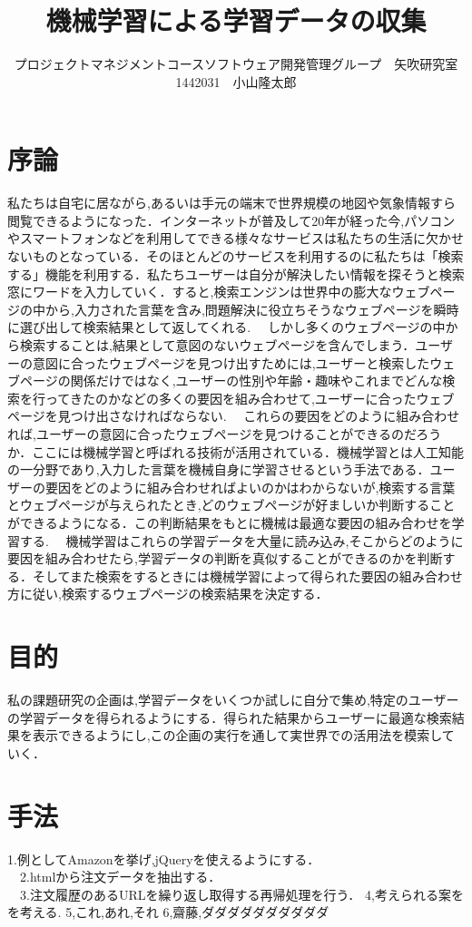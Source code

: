 \documentclass[uplatex,twocolumn,dvipdfmx]{jsarticle}
\title{\vspace{-5mm}\fontsize{14pt}{0pt}\selectfont 機械学習による学習データの収集}
\author{\normalsize プロジェクトマネジメントコースソフトウェア開発管理グループ　矢吹研究室　1442031　小山隆太郎}
\date{}
\begin{document}
\fontsize{10.5pt}{\baselineskip}\selectfont
\maketitle





\section{序論}
私たちは自宅に居ながら,あるいは手元の端末で世界規模の地図や気象情報すら閲覧できるようになった．インターネットが普及して20年が経った今,パソコンやスマートフォンなどを利用してできる様々なサービスは私たちの生活に欠かせないものとなっている．そのほとんどのサービスを利用するのに私たちは「検索する」機能を利用する．私たちユーザーは自分が解決したい情報を探そうと検索窓にワードを入力していく．すると,検索エンジンは世界中の膨大なウェブページの中から,入力された言葉を含み,問題解決に役立ちそうなウェブページを瞬時に選び出して検索結果として返してくれる.\cite{KADOKAWA2015}
　しかし多くのウェブページの中から検索することは,結果として意図のないウェブページを含んでしまう．ユーザーの意図に合ったウェブページを見つけ出すためには,ユーザーと検索したウェブページの関係だけではなく,ユーザーの性別や年齢・趣味やこれまでどんな検索を行ってきたのかなどの多くの要因を組み合わせて,ユーザーに合ったウェブページを見つけ出さなければならない.\cite{GENTOSYA2014}
　これらの要因をどのように組み合わせれば,ユーザーの意図に合ったウェブページを見つけることができるのだろうか．ここには機械学習と呼ばれる技術が活用されている．機械学習とは人工知能の一分野であり,入力した言葉を機械自身に学習させるという手法である．ユーザーの要因をどのように組み合わせればよいのかはわからないが,検索する言葉とウェブページが与えられたとき,どのウェブページが好ましいか判断することができるようになる．この判断結果をもとに機械は最適な要因の組み合わせを学習する.\cite{SOTURON2015}
　機械学習はこれらの学習データを大量に読み込み,そこからどのように要因を組み合わせたら,学習データの判断を真似することができるのかを判断する．そしてまた検索をするときには機械学習によって得られた要因の組み合わせ方に従い,検索するウェブページの検索結果を決定する．


\section{目的}
私の課題研究の企画は,学習データをいくつか試しに自分で集め,特定のユーザーの学習データを得られるようにする．得られた結果からユーザーに最適な検索結果を表示できるようにし,この企画の実行を通して実世界での活用法を模索していく．


\section{手法}
1.例としてAmazonを挙げ,jQueryを使えるようにする．\\
　2.htmlから注文データを抽出する．\\
　3.注文履歴のあるURLを繰り返し取得する再帰処理を行う．
  4,考えられる案をを考える.
  5,これ,あれ,それ
  6,齋藤,ダダダダダダダダダダ


\end{document}
